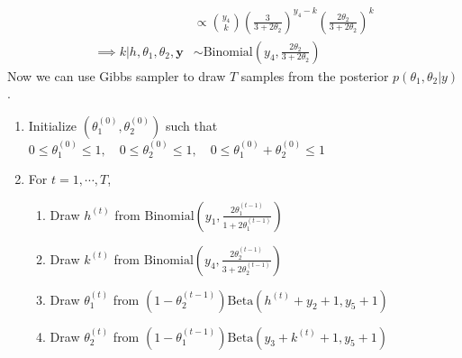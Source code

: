 \documentclass[a4paper,12pt]{article}\usepackage[]{graphicx}\usepackage[]{color}
\newcommand{\by}{\mathbf{y}}
\newcommand{\Beta}{\mathrm{Beta}}
\newcommand{\Binomial}{\mathrm{Binomial}}
\begin{document}
\begin{enumerate}[label=(\alph*)]
\begin{align*}
&\propto \binom{y_4}{k}\left(\frac{3}{3+2\theta_2}\right)^{y_4-k}\left(\frac{2\theta_2}{3+2\theta_2}\right)^k\\
\implies k|h,\theta_1,\theta_2,\by&\sim\Binomial\left(y_4,\frac{2\theta_2}{3+2\theta_2}\right)
\end{align*}
Now we can use Gibbs sampler to draw $T$ samples from the posterior $p(\theta_1,\theta_2|y)$.
\begin{enumerate}[label=(\roman*)]
	\item Initialize $(\theta_1^{(0)},\theta_2^{(0)})$ such that $0\leq\theta_1^{(0)}\leq1,\quad0\leq\theta_2^{(0)}\leq1,\quad0\leq\theta_1^{(0)}+\theta_2^{(0)}\leq1$
	\item For $t=1,\cdots,T$,
	\begin{enumerate}[label=(\arabic*)]	
		\item Draw $h^{(t)}$ from $\Binomial\left(y_1,\frac{2\theta_1^{(t-1)}}{1+2\theta_1^{(t-1)}}\right)$
		\item Draw $k^{(t)}$ from $\Binomial\left(y_4,\frac{2\theta_2^{(t-1)}}{3+2\theta_2^{(t-1)}}\right)$
		\item Draw $\theta_1^{(t)}$ from $(1-\theta_2^{(t-1)})\Beta(h^{(t)}+y_2+1,y_5+1)$
		\item Draw $\theta_2^{(t)}$ from $(1-\theta_1^{(t-1)})\Beta(y_3+k^{(t)}+1,y_5+1)$
	\end{enumerate}
\end{enumerate}
\end{enumerate}
\newpage
\end{document}
